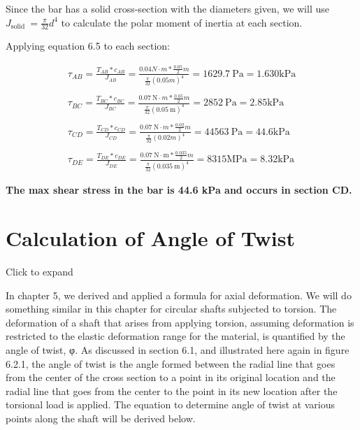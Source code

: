 \documentclass[
  letterpaper,
  DIV=11,
  numbers=noendperiod]{scrreprt}
\begin{document}
\begin{tcolorbox}
\begin{tcolorbox}
Since the bar has a solid cross-section with the diameters given, we
will use \(J_{\text {solid }}=\frac{\pi}{32} d^4\) to calculate the
polar moment of inertia at each section.

Applying equation 6.5 to each section:

\[
\begin{gathered}
\tau_{A B}=\frac{T_{A B} * c_{A B}}{J_{A B}}=\frac{0.04 N \cdot m * \frac{0.05}{2} m} {\frac{\pi}{32}(0.05 m)^4}=1629.7 \mathrm{~Pa}=1.630 \mathrm{kPa} \\
\\
\tau_{B C}=\frac{T_{B C} * c_{B C}}{J_{B C}}=\frac{0.07 \mathrm{~N} \cdot m * \frac{0.05}{2} m}{\frac{\pi}{32}(0.05 \mathrm{~m})^4}=2852 \mathrm{~Pa}=2.85 \mathrm{kPa} \\
\\
\tau_{C D}=\frac{T_{C D} * c_{C D}}{J_{C D}}=\frac{0.07 \mathrm{~N} \cdot m * \frac{0.02}{2} m}{\frac{\pi}{32}(0.02 m)^4}=44563 \mathrm{~Pa}=44.6 \mathrm{kPa} \\
\\
\tau_{D E}=\frac{T_{D E} * c_{D E}}{J_{D E}}=\frac{0.07 \mathrm{~N} \cdot \mathrm{m} * \frac{0.035}{2} m}{\frac{\pi}{32}(0.035 \mathrm{~m})^4}=8315 \mathrm{MPa}=8.32 \mathrm{kPa}
\end{gathered}
\]

\textbf{The max shear stress in the bar is 44.6 kPa and occurs in
section CD.}

\end{tcolorbox}

\end{tcolorbox}

\section{Calculation of Angle of Twist}\label{sec-6.2}

Click to expand

In chapter 5, we derived and applied a formula for axial deformation. We
will do something similar in this chapter for circular shafts subjected
to torsion. The deformation of a shaft that arises from applying
torsion, assuming deformation is restricted to the elastic deformation
range for the material, is quantified by the angle of twist, φ. As
discussed in section 6.1, and illustrated here again in figure 6.2.1,
the angle of twist is the angle formed between the radial line that goes
from the center of the cross section to a point in its original location
and the radial line that goes from the center to the point in its new
location after the torsional load is applied. The equation to determine
angle of twist at various points along the shaft will be derived below.
\end{document}
